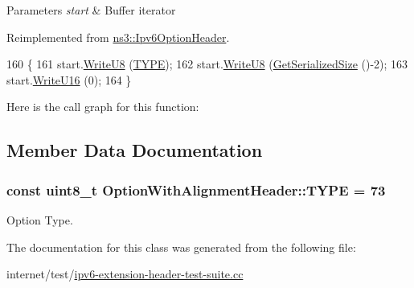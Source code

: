 \begin{DoxyParams}{Parameters}
{\em start} & Buffer iterator \\
\hline
\end{DoxyParams}


Reimplemented from \hyperlink{classns3_1_1Ipv6OptionHeader_aad98aee0f35bb8f1306a259fb286b5f7}{ns3\+::\+Ipv6\+Option\+Header}.


\begin{DoxyCode}
160   \{
161     start.\hyperlink{classns3_1_1Buffer_1_1Iterator_a3c7bacca6cbb821c9d14fa4626b7ae16}{WriteU8} (\hyperlink{classOptionWithAlignmentHeader_a196dd8d16dd06cbab2c11a818083f684}{TYPE});
162     start.\hyperlink{classns3_1_1Buffer_1_1Iterator_a3c7bacca6cbb821c9d14fa4626b7ae16}{WriteU8} (\hyperlink{classOptionWithAlignmentHeader_a33579630e52088259561d88b312fbd03}{GetSerializedSize} ()-2);
163     start.\hyperlink{classns3_1_1Buffer_1_1Iterator_a67fdfa2b4295a6f807b9670c7c8e4c0b}{WriteU16} (0);
164   \}
\end{DoxyCode}


Here is the call graph for this function\+:




\subsection{Member Data Documentation}
\subsubsection[{\texorpdfstring{T\+Y\+PE}{TYPE}}]{\setlength{\rightskip}{0pt plus 5cm}const uint8\+\_\+t Option\+With\+Alignment\+Header\+::\+T\+Y\+PE = 73\hspace{0.3cm}{\ttfamily [static]}}\hypertarget{classOptionWithAlignmentHeader_a196dd8d16dd06cbab2c11a818083f684}{}\label{classOptionWithAlignmentHeader_a196dd8d16dd06cbab2c11a818083f684}


Option Type. 



The documentation for this class was generated from the following file\+:\begin{DoxyCompactItemize}
\item 
internet/test/\hyperlink{ipv6-extension-header-test-suite_8cc}{ipv6-\/extension-\/header-\/test-\/suite.\+cc}\end{DoxyCompactItemize}
